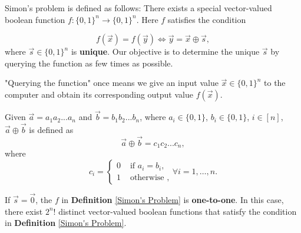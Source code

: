 \begin{definition}\label{Simon's Problem}
Simon's \cite{simon1997power} problem is defined as follows: There exists a special vector-valued boolean function $f:\{0,1\}^n \rightarrow\{0,1\}^n$. Here $f$ satisfies the condition

$$
f(\vec{x})=f(\vec{y}) \iff \vec{y}=\vec{x}\oplus \vec{s},
$$ 
where $\vec{s}\in\{0,1\}^n$ is \textbf{unique}. Our objective is to determine the unique $\vec{s}$ by querying the function as few times as possible.
\end{definition}

\begin{remark}
"Querying the function" once means we give an input value $\vec{x} \in \{0,1\}^n$ to the computer and obtain its corresponding output value $f(\vec{x})$.
\end{remark}
	
\begin{mdframed}
	Given $\vec{a}=a_1a_2...a_n$ and $\vec{b}=b_1b_2...b_n$, where $a_i\in\{0,1\}$, $b_i\in\{0,1\}$, $i\in[n]$, $\vec{a}\oplus \vec{b}$ is defined as   
	\[
	\vec{a}\oplus \vec{b}=c_1c_2...c_n,
	\]
	where
	$$
	c_i=\left\{\begin{array}{ll}
		0 & \text { if } a_i = b_i, \\
		1 & \text { otherwise },
	\end{array} \forall i=1, \ldots, n.\right.
	$$
\end{mdframed}

	
\begin{property}
If $\vec{s}=\vec{0}$, the $f$ in \textbf{Definition} \ref{Simon's Problem} is \textbf{one-to-one}. In this case, there exist $2^n !$ distinct vector-valued boolean functions that satisfy the condition in \textbf{Definition} \ref{Simon's Problem}.
\end{property}

